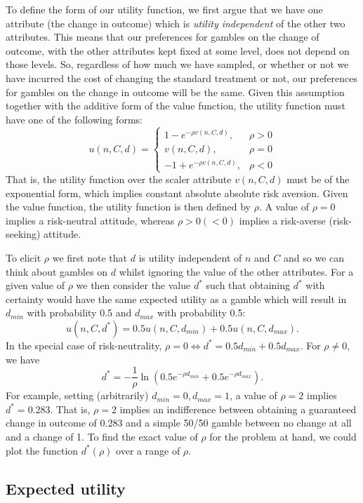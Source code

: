 \documentclass[sagev]{sagej}
\begin{document}
To define the form of our utility function, we first argue that we have one attribute (the change in outcome) which is \emph{utility independent} of the other two attributes. This means that our preferences for gambles on the change of outcome, with the other attributes kept fixed at some level, does not depend on those levels. So, regardless of how much we have sampled, or whether or not we have incurred the cost of changing the standard treatment or not, our preferences for gambles on the change in outcome will be the same. Given this assumption together with the additive form of the value function, the utility function must have one of the following forms:
$$
u(n, C, d) =
\begin{cases}
1 - e^{-\rho v(n, C, d)}, &\rho > 0 \\
v(n, C, d), &\rho = 0 \\
-1 + e^{-\rho v(n, C, d)}, &\rho < 0 
\end{cases}
$$
That is, the utility function over the scaler attribute $v(n, C, d)$ must be of the exponential form, which implies constant absolute absolute risk aversion. Given the value function, the utility function is then defined by $\rho$. A value of $\rho = 0$ implies a risk-neutral attitude, whereas $\rho > 0 (< 0)$ implies a risk-averse (risk-seeking) attitude. 

To elicit $\rho$ we first note that $d$ is utility independent of $n$ and $C$ and so we can think about gambles on $d$ whilst ignoring the value of the other attributes. For a given value of $\rho$ we then consider the value $d^*$ such that obtaining $d^*$ with certainty would have the same expected utility as a gamble which will result in $d_{min}$ with probability 0.5 and $d_{max}$ with probability 0.5:
$$
u(n, C, d^*) = 0.5u(n, C, d_{min}) + 0.5u(n, C, d_{max}).
$$
In the special case of risk-neutrality, $\rho = 0 \Leftrightarrow d^* = 0.5d_{min} + 0.5d_{max}$. For $\rho \neq 0$, we have
$$
d^* = - \frac{1}{\rho} \ln\left( 0.5e^{-\rho d_{min}} + 0.5e^{-\rho d_{max}} \right).
$$
For example, setting (arbitrarily) $d_{min} = 0, d_{max} = 1$, a value of $\rho = 2$ implies $d^* =  0.283$. That is, $\rho = 2$ implies an indifference between obtaining a guaranteed change in outcome of 0.283 and a simple 50/50 gamble between no change at all and a change of 1. To find the exact value of $\rho$ for the problem at hand, we could plot the function $d^*(\rho)$ over a range of $\rho$.

\subsection{Expected utility}
\end{document}
